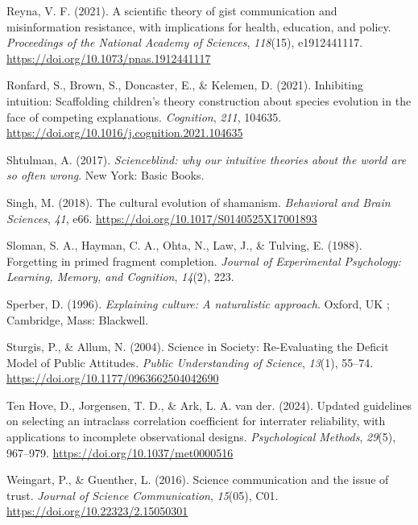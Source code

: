 \documentclass[
  english,
  doc,floatsintext]{apa6}
\newlength{\cslhangindent}
\newenvironment{CSLReferences}[2] %
 {\begin{list}{}{%
  \setlength{\itemindent}{0pt}
  \setlength{\leftmargin}{0pt}
  \setlength{\parsep}{0pt}
  \ifodd #1
   \setlength{\leftmargin}{\cslhangindent}
   \setlength{\itemindent}{-1\cslhangindent}
  \fi
  \setlength{\itemsep}{#2\baselineskip}}}
 {\end{list}}
\begin{document}
\begin{CSLReferences}{1}{0}
Reyna, V. F. (2021). A scientific theory of gist communication and misinformation resistance, with implications for health, education, and policy. \emph{Proceedings of the National Academy of Sciences}, \emph{118}(15), e1912441117. \url{https://doi.org/10.1073/pnas.1912441117}

Ronfard, S., Brown, S., Doncaster, E., \& Kelemen, D. (2021). Inhibiting intuition: Scaffolding children's theory construction about species evolution in the face of competing explanations. \emph{Cognition}, \emph{211}, 104635. \url{https://doi.org/10.1016/j.cognition.2021.104635}

Shtulman, A. (2017). \emph{Scienceblind: why our intuitive theories about the world are so often wrong}. New York: Basic Books.

Singh, M. (2018). The cultural evolution of shamanism. \emph{Behavioral and Brain Sciences}, \emph{41}, e66. \url{https://doi.org/10.1017/S0140525X17001893}

Sloman, S. A., Hayman, C. A., Ohta, N., Law, J., \& Tulving, E. (1988). Forgetting in primed fragment completion. \emph{Journal of Experimental Psychology: Learning, Memory, and Cognition}, \emph{14}(2), 223.

Sperber, D. (1996). \emph{Explaining culture: A naturalistic approach}. Oxford, UK ; Cambridge, Mass: Blackwell.

Sturgis, P., \& Allum, N. (2004). Science in Society: Re-Evaluating the Deficit Model of Public Attitudes. \emph{Public Understanding of Science}, \emph{13}(1), 55--74. \url{https://doi.org/10.1177/0963662504042690}

Ten Hove, D., Jorgensen, T. D., \& Ark, L. A. van der. (2024). Updated guidelines on selecting an intraclass correlation coefficient for interrater reliability, with applications to incomplete observational designs. \emph{Psychological Methods}, \emph{29}(5), 967--979. \url{https://doi.org/10.1037/met0000516}

Weingart, P., \& Guenther, L. (2016). Science communication and the issue of trust. \emph{Journal of Science Communication}, \emph{15}(05), C01. \url{https://doi.org/10.22323/2.15050301}


\end{CSLReferences}
\end{document}
